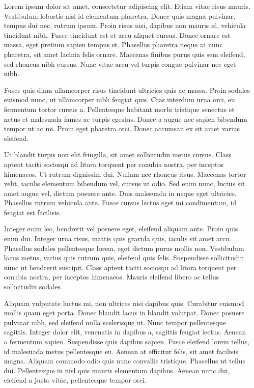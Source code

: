 \documentclass[a4paper,11pt]{article}
\date{}
\begin{document}
Lorem ipsum dolor sit amet, consectetur adipiscing elit. Etiam vitae risus mauris. Vestibulum lobortis nisl id elementum pharetra. Donec quis magna pulvinar, tempus dui nec, rutrum ipsum. Proin risus nisi, dapibus non mauris id, vehicula tincidunt nibh. Fusce tincidunt est et arcu aliquet cursus. Donec ornare est massa, eget pretium sapien tempus et. Phasellus pharetra neque at nunc pharetra, sit amet lacinia felis ornare. Maecenas finibus purus quis sem eleifend, sed rhoncus nibh cursus. Nunc vitae arcu vel turpis congue pulvinar nec eget nibh.

Fusce quis diam ullamcorper risus tincidunt ultricies quis ac massa. Proin sodales euismod nunc, ut ullamcorper nibh feugiat quis. Cras interdum urna orci, eu fermentum tortor cursus a. Pellentesque habitant morbi tristique senectus et netus et malesuada fames ac turpis egestas. Donec a augue nec sapien bibendum tempor ut ac mi. Proin eget pharetra orci. Donec accumsan ex sit amet varius eleifend.

Ut blandit turpis non elit fringilla, sit amet sollicitudin metus cursus. Class aptent taciti sociosqu ad litora torquent per conubia nostra, per inceptos himenaeos. Ut rutrum dignissim dui. Nullam nec rhoncus risus. Maecenas tortor velit, iaculis elementum bibendum vel, cursus ut odio. Sed enim nunc, luctus sit amet augue vel, dictum posuere ante. Duis malesuada in neque eget ultricies. Phasellus rutrum vehicula ante. Fusce cursus lectus eget mi condimentum, id feugiat est facilisis.

Integer enim leo, hendrerit vel posuere eget, eleifend aliquam ante. Proin quis enim dui. Integer urna risus, mattis quis gravida quis, iaculis sit amet arcu. Phasellus sodales pellentesque lorem, eget dictum purus mollis non. Vestibulum lacus metus, varius quis rutrum quis, eleifend quis felis. Suspendisse sollicitudin nunc ut hendrerit suscipit. Class aptent taciti sociosqu ad litora torquent per conubia nostra, per inceptos himenaeos. Mauris eleifend libero ac tellus sollicitudin sodales.

Aliquam vulputate luctus mi, non ultrices nisi dapibus quis. Curabitur euismod mollis quam eget porta. Donec blandit lacus in blandit volutpat. Donec posuere pulvinar nibh, sed eleifend nulla scelerisque ut. Nunc tempor pellentesque sagittis. Integer dolor elit, venenatis in dapibus a, sagittis feugiat lectus. Aenean a fermentum sapien. Suspendisse quis dapibus sapien. Fusce eleifend lorem tellus, id malesuada metus pellentesque eu. Aenean at efficitur felis, sit amet facilisis magna. Aliquam commodo odio quis nunc convallis tristique. Phasellus ut tellus dui. Pellentesque in nisl quis mauris elementum dapibus. Aenean nunc dui, eleifend a justo vitae, pellentesque tempor orci. 
\end{document}
